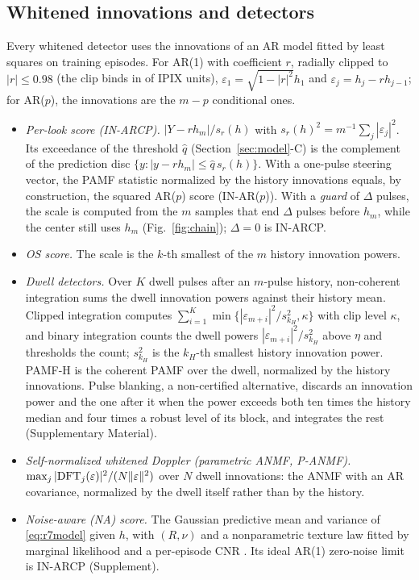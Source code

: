 \documentclass[journal]{IEEEtran}
\begin{document}
\subsection{Whitened innovations and detectors}
Every whitened detector uses the innovations of an AR model fitted by least squares on training episodes. For AR(1) with coefficient $r$, radially clipped to $|r|\le0.98$ (the clip binds in \FitClampBinding{} of \NUnitsConf{} IPIX units), $\varepsilon_1=\sqrt{1-|r|^2}h_1$ and $\varepsilon_j=h_j-rh_{j-1}$; for AR($p$), the innovations are the $m-p$ conditional ones.
\begin{itemize}[leftmargin=*,itemsep=1pt]
\item \emph{Per-look score (IN-ARCP).} $|Y-rh_m|/s_r(h)$ with $s_r(h)^2=m^{-1}\sum_j|\varepsilon_j|^2$. Its exceedance of the threshold $\widehat q$ (Section~\ref{sec:model}-C) is the complement of the prediction disc $\{y:|y-rh_m|\le\widehat q\,s_r(h)\}$. With a one-pulse steering vector, the PAMF statistic normalized by the history innovations equals, by construction, the squared AR($p$) score (IN-AR($p$)). With a \emph{guard} of $\Delta$ pulses, the scale is computed from the $m$ samples that end $\Delta$ pulses before $h_m$, while the center still uses $h_m$ (Fig.~\ref{fig:chain}); $\Delta=0$ is IN-ARCP.
\item \emph{OS score.} The scale is the $k$-th smallest of the $m$ history innovation powers.
\item \emph{Dwell detectors.} Over $K$ dwell pulses after an $m$-pulse history, non-coherent integration sums the dwell innovation powers against their history mean. Clipped integration computes $\sum_{i=1}^K\min\{|\varepsilon_{m+i}|^2/s_{k_H}^2,\kappa\}$ with clip level $\kappa$, and binary integration counts the dwell powers $|\varepsilon_{m+i}|^2/s_{k_H}^2$ above $\eta$ and thresholds the count; $s_{k_H}^2$ is the $k_H$-th smallest history innovation power. PAMF-H is the coherent PAMF over the dwell, normalized by the history innovations. Pulse blanking, a non-certified alternative, discards an innovation power and the one after it when the power exceeds both ten times the history median and four times a robust level of its block, and integrates the rest (Supplementary Material).
\item \emph{Self-normalized whitened Doppler (parametric ANMF, P-ANMF).} $\max_j|{\rm DFT}_j(\varepsilon)|^2/(N\|\varepsilon\|^2)$ over $N$ dwell innovations: the ANMF with an AR covariance, normalized by the dwell itself rather than by the history.
\item \emph{Noise-aware (NA) score.} The Gaussian predictive mean and variance of \eqref{eq:r7model} given $h$, with $(R,\nu)$ and a nonparametric texture law fitted by marginal likelihood and a per-episode CNR \cite{ignatiadis2025}. Its ideal AR(1) zero-noise limit is IN-ARCP (Supplement).
\end{itemize}
\end{document}
